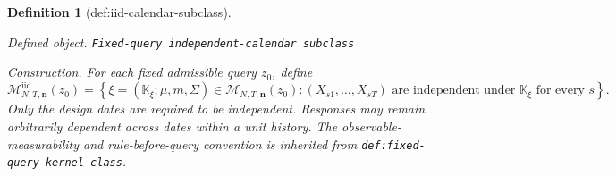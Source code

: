 \documentclass{article}
\newtheorem{definition}{Definition}
\begin{document}
\begin{definition}[def:iid-calendar-subclass]\label{def:iid-calendar-subclass}
\par\smallskip\noindent\emph{Defined object.} \texttt{Fixed-\allowbreak{}query independent-\allowbreak{}calendar subclass}
\par\smallskip\noindent\emph{Construction.} For each fixed admissible query \(z_0\), define
\[
 \mathcal M^{\mathrm{iid}}_{N,T,\mathbf n}(z_0)
 =\left\{\xi=(\mathbb K_\xi;\mu,m,\Sigma)
 \in\mathcal M_{N,T,\mathbf n}(z_0):
 (X_{s1},\ldots,X_{sT})\text{ are independent under }\mathbb K_\xi
 \text{ for every }s\right\}.
\]
Only the design dates are required to be independent.  Responses may remain arbitrarily dependent across dates within a unit history.  The observable-measurability and rule-before-query convention is inherited from \texttt{def:fixed-query-kernel-class}.
\end{definition}
\end{document}
